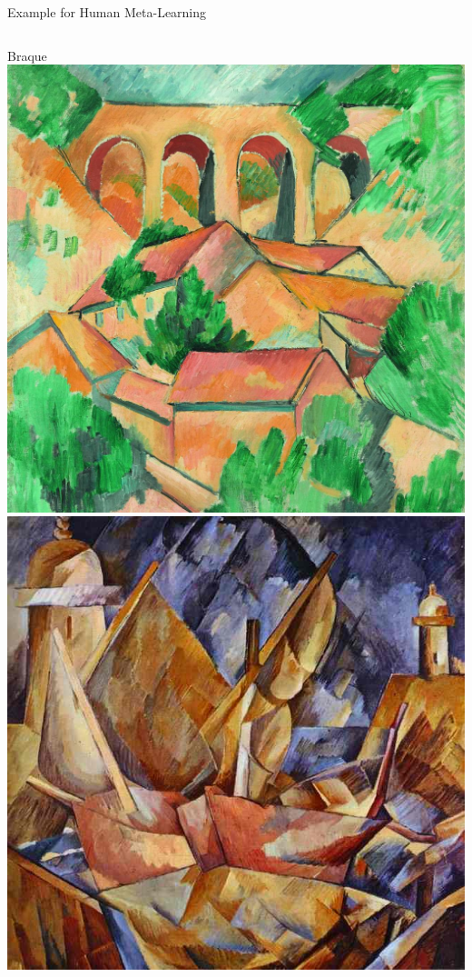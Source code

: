 \begin{frame}[c]{Example for Human Meta-Learning}

\begin{columns}
	Braque
	\centering
	\includegraphics[width=1.0\textwidth]{images/braque1.jpg}
	\includegraphics[width=1.0\textwidth]{images/braque2.jpeg}

\end{columns}
\end{frame}
